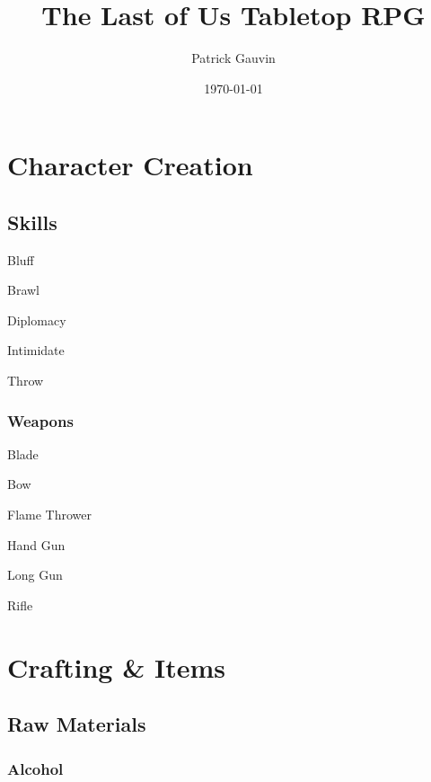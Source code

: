 \documentclass[10pt,twoside,twocolumn]{book}
\title{The Last of Us Tabletop RPG}
\date{\today}
\author{Patrick Gauvin}
\begin{document}
\selectfont %
\frontmatter

\maketitle
\begin{multicols}{2}
\tableofcontents
\end{multicols}

%
%
\mainmatter
\chapter{Character Creation}

\section{Skills}

\begin{rpg-list}
  \item Bluff
  \item Brawl
  \item Diplomacy
  \item Intimidate
  \item Throw
\end{rpg-list}

\subsection{Weapons}

\begin{rpg-list}
  \item Blade
  \item Bow
  \item Flame Thrower
  \item Hand Gun
  \item Long Gun
  \item Rifle
\end{rpg-list}

%
%
\mainmatter
\chapter{Crafting \& Items}

\section{Raw Materials}

\subsection{Alcohol}
\end{document}
